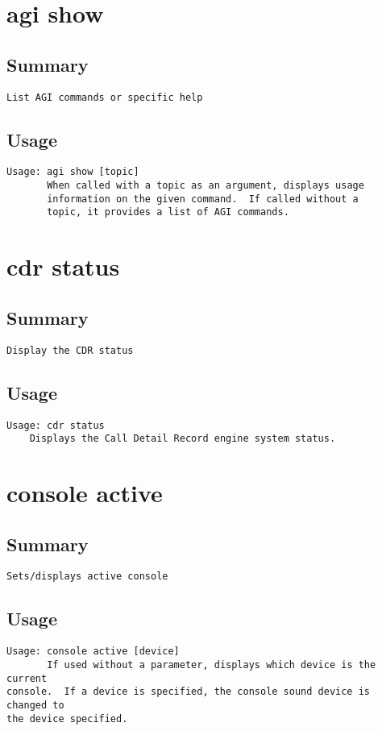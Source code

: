 \section{agi show}
\subsection{Summary}
\begin{verbatim}
List AGI commands or specific help
\end{verbatim}
\subsection{Usage}
\begin{verbatim}
Usage: agi show [topic]
       When called with a topic as an argument, displays usage
       information on the given command.  If called without a
       topic, it provides a list of AGI commands.

\end{verbatim}


\section{cdr status}
\subsection{Summary}
\begin{verbatim}
Display the CDR status
\end{verbatim}
\subsection{Usage}
\begin{verbatim}
Usage: cdr status
	Displays the Call Detail Record engine system status.

\end{verbatim}


\section{console active}
\subsection{Summary}
\begin{verbatim}
Sets/displays active console
\end{verbatim}
\subsection{Usage}
\begin{verbatim}
Usage: console active [device]
       If used without a parameter, displays which device is the current
console.  If a device is specified, the console sound device is changed to
the device specified.

\end{verbatim}



